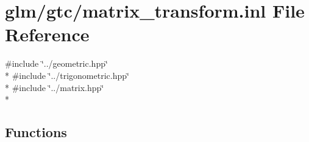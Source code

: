 \hypertarget{matrix__transform_8inl}{\section{glm/gtc/matrix\-\_\-transform.inl File Reference}
\label{matrix__transform_8inl}
}
{\ttfamily \#include \char`\"{}../geometric.\-hpp\char`\"{}}\\*
{\ttfamily \#include \char`\"{}../trigonometric.\-hpp\char`\"{}}\\*
{\ttfamily \#include \char`\"{}../matrix.\-hpp\char`\"{}}\\*
\subsection*{Functions}
